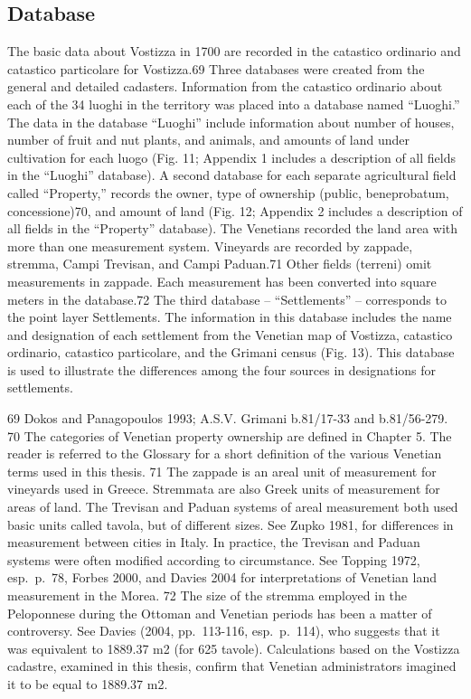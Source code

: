 \documentclass[english,]{book}
\begin{document}
\hypertarget{database}{%
\subsection{Database}\label{database}}

The basic data about Vostizza in 1700 are recorded in the catastico ordinario and catastico particolare for Vostizza.69 Three databases were created from the general and detailed cadasters. Information from the catastico ordinario about each of the 34 luoghi in the territory was placed into a database named ``Luoghi.'' The data in the database ``Luoghi'' include information about number of houses, number of fruit and nut plants, and animals, and amounts of land under cultivation for each luogo (Fig. 11; Appendix 1 includes a description of all fields in the ``Luoghi'' database).
A second database for each separate agricultural field called ``Property,'' records the owner, type of ownership (public, beneprobatum, concessione)70, and amount of land (Fig. 12; Appendix 2 includes a description of all fields in the ``Property'' database). The Venetians recorded the land area with more than one measurement system. Vineyards are recorded by zappade, stremma, Campi Trevisan, and Campi Paduan.71 Other fields (terreni) omit measurements in zappade. Each measurement has been converted into square meters in the database.72
The third database -- ``Settlements'' -- corresponds to the point layer Settlements. The information in this database includes the name and designation of each settlement from the Venetian map of Vostizza, catastico ordinario, catastico particolare, and the Grimani census (Fig. 13). This database is used to illustrate the differences among the four sources in designations for settlements.

69 Dokos and Panagopoulos 1993; A.S.V. Grimani b.81/17-33 and b.81/56-279.
70 The categories of Venetian property ownership are defined in Chapter 5. The reader is referred to the Glossary for a short definition of the various Venetian terms used in this thesis.
71 The zappade is an areal unit of measurement for vineyards used in Greece. Stremmata are also Greek units of measurement for areas of land. The Trevisan and Paduan systems of areal measurement both used basic units called tavola, but of different sizes. See Zupko 1981, for differences in measurement between cities in Italy. In practice, the Trevisan and Paduan systems were often modified according to circumstance. See Topping 1972, esp.~p.~78, Forbes 2000, and Davies 2004 for interpretations of Venetian land measurement in the Morea.
72 The size of the stremma employed in the Peloponnese during the Ottoman and Venetian periods has been a matter of controversy. See Davies (2004, pp.~113-116, esp.~p.~114), who suggests that it was equivalent to 1889.37 m2 (for 625 tavole). Calculations based on the Vostizza cadastre, examined in this thesis, confirm that Venetian administrators imagined it to be equal to 1889.37 m2.
\end{document}
